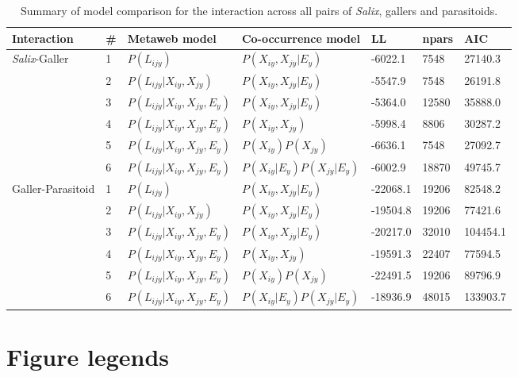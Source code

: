 \documentclass[12pt]{article}
\begin{document}
\begin{landscape}
\begin{table}[]
\centering
\caption{Summary of model comparison for the interaction across all pairs of \textit{Salix}, gallers and parasitoids.}
\begin{tabular}{lllllll}
\hline
	Interaction & \# & Metaweb model & Co-occurrence model & LL & npars & AIC \\ \hline
	\textit{Salix}-Galler & 1 & $P(L_{ijy})$ & $P(X_{iy},X_{jy}|E_y)$ & -6022.1 & 7548 & 27140.3 \\
	 & 2 & $P(L_{ijy}|X_{iy},X_{jy})$ & $P(X_{iy},X_{jy}|E_y)$ & -5547.9 & 7548 & 26191.8 \\
	 & 3 & $P(L_{ijy} | X_{iy}, X_{jy}, E_y)$ & $P(X_{iy},X_{jy}|E_y)$ & -5364.0 & 12580 & 35888.0 \\
	 & 4 & $P(L_{ijy} | X_{iy}, X_{jy}, E_y)$ & $P(X_{iy},X_{jy})$ & -5998.4 & 8806 & 30287.2 \\
	 & 5 & $P(L_{ijy} | X_{iy}, X_{jy}, E_y)$ & $P(X_{iy})P(X_{jy})$ & -6636.1 & 7548 & 27092.7 \\
	 & 6 & $P(L_{ijy} | X_{iy}, X_{jy}, E_y)$ & $P(X_{iy}|E_y)P(X_{jy}|E_y)$ & -6002.9 & 18870 & 49745.7 \\ \hline
	Galler-Parasitoid & 1 & $P(L_{ijy})$ & $P(X_{iy},X_{jy}|E_y)$ & -22068.1 & 19206 & 82548.2 \\
	 & 2 & $P(L_{ijy} | X_{iy}, X_{jy})$ & $P(X_{iy},X_{jy}|E_y)$ & -19504.8 & 19206 & 77421.6 \\
	 & 3 & $P(L_{ijy} | X_{iy}, X_{jy}, E_y)$ & $P(X_{iy},X_{jy}|E_y)$ & -20217.0 & 32010 & 104454.1 \\
	 & 4 & $P(L_{ijy} | X_{iy}, X_{jy}, E_y)$ & $P(X_{iy},X_{jy})$ & -19591.3 & 22407 & 77594.5 \\
	 & 5 & $P(L_{ijy} | X_{iy}, X_{jy}, E_y)$ & $P(X_{iy})P(X_{jy})$ & -22491.5 & 19206 & 89796.9 \\
	 & 6 & $P(L_{ijy} | X_{iy}, X_{jy}, E_y)$ & $P(X_{iy}|E_y)P(X_{jy}|E_y)$ & -18936.9 & 48015 & 133903.7 \\
\hline
\end{tabular}
\end{table}
\end{landscape}

\newpage
\section*{Figure legends}
\end{document}
